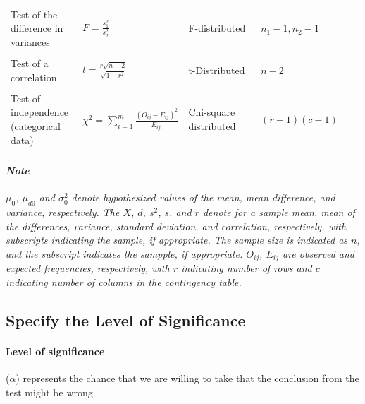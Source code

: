 \begin{table}[h!]
\begin{center}
\begin{tabular}{p{0.23\linewidth} p{0.25\linewidth} p{0.27\linewidth} p{0.2\linewidth}}
			\\
			Test of the difference in variances     & $F = \displaystyle \frac{s^2_1}{s^2_2}$                                                                              & F-distributed                     & $n_1-1, n_2-1$             \\
			\\
			Test of a correlation                   & $t = \displaystyle \frac{r \sqrt{n-2}}{\sqrt{1-r^2}}$                                                                & t-Distributed                     & $n-2$                      \\
			\\
			Test of independence (categorical data) & $\chi^2 = \displaystyle \sum_{i=1}^{m}\frac{(O_{ij}-E_{ij})^2}{E_{iji}}$                                             & Chi-square distributed            & $(r-1)(c-1)$               \\
			\bottomrule
		\end{tabular}
	\end{center}
\end{table}
\paragraph{\textit{Note}} \textit{$\mu_0$, $\mu_{d0}$ and $\sigma^2_0$ denote hypothesized values of the mean, mean difference, and variance, respectively.
	The $\overline{X}$, $\overline{d}$, $s^2$, $s$, and $r$ denote for a sample mean, mean of the differences, variance, standard deviation, and correlation, respectively,
	with subscripts indicating the sample, if appropriate.
	The sample size is indicated as $n$, and the subscript indicates the sampple, if appropriate.
	$O_{ij}$, $E_{ij}$ are observed and expected frequencies, respectively,
	with $r$ indicating number of rows and $c$ indicating number of columns in the contingency table.}
\subsection{Specify the Level of Significance} %
\label{sub:Specify the Level of Significance}
\paragraph{Level of significance} %
\label{par:Level of significance}
($\alpha$) represents the chance that we are willing to take that the conclusion from the test might be wrong.

